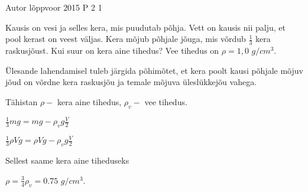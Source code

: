 {Autor} %
{lõppvoor} %
{2015} %
{P 2} %
{1} %
{

\ifStatement
 Kausis on vesi ja selles kera, mis puudutab põhja. Vett on kausis nii palju, et pool kerast on veest väljas. Kera mõjub põhjale jõuga, mis võrdub $\frac{1}{3}$ kera raskusjõust. Kui suur on kera aine tihedus? Vee tihedus on $\rho = 1,0$ $g/cm^3$.
\fi


\ifHint
Ülesande lahendamisel tuleb järgida põhimõtet, et kera poolt kausi põhjale mõjuv jõud on võrdne kera raskusjõu ja temale mõjuva üleslükkejõu vahega.
\fi

\ifSolution
Tähistan $\rho -$ kera aine tihedus, $\rho_v -$ vee tihedus.
\begin{center}
$\frac{1}{3}mg = mg- \rho_v g \frac{V}{2}$
\end{center}
\begin{center}
$\frac{1}{3}\rho V g = \rho V g - \rho_v g \frac{V}{2}$
\end{center}
Sellest saame kera aine tiheduseks
\begin{center}
$\rho = \frac{3}{4} \rho_v = 0.75$ $g/cm^3$.
\end{center}
\fi
}